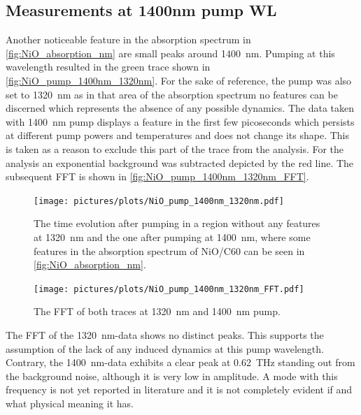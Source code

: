\subsection{Measurements at 1400nm pump WL}
Another noticeable feature in the absorption spectrum in \autoref{fig:NiO_absorption_nm} are small peaks around \qty{1400}{nm}.
Pumping at this wavelength resulted in the green trace shown in \autoref{fig:NiO_pump_1400nm_1320nm}.
For the sake of reference, the pump was also set to \qty{1320}{nm} as in that area of the absorption spectrum no features can be discerned which represents the absence of any possible dynamics.
The data taken with \qty{1400}{nm} pump displays a feature in the first few picoseconds which persists at different pump powers and temperatures and does not change its shape.
This is taken as a reason to exclude this part of the trace from the analysis.
For the analysis an exponential background was subtracted depicted by the red line.
The subsequent FFT is shown in \autoref{fig:NiO_pump_1400nm_1320nm_FFT}.
\vspace*{-0.5cm}
\begin{figure}[ht]
    \centering
    \texttt{[image: pictures/plots/NiO\_pump\_1400nm\_1320nm.pdf]} \vspace{-0.5cm}
    \caption{The time evolution after pumping in a region without any features at \qty{1320}{nm} and the one after pumping at \qty{1400}{nm}, where some features in the absorption spectrum of NiO/C60 can be seen in \autoref{fig:NiO_absorption_nm}.}
    \label{fig:NiO_pump_1400nm_1320nm}
\end{figure}
\FloatBarrier
\begin{figure}[ht]
    \centering
    \texttt{[image: pictures/plots/NiO\_pump\_1400nm\_1320nm\_FFT.pdf]} \vspace{-0.5cm}
    \caption{The FFT of both traces at \qty{1320}{nm} and \qty{1400}{nm} pump.}
    \label{fig:NiO_pump_1400nm_1320nm_FFT}
\end{figure}
\FloatBarrier
The FFT of the \qty{1320}{nm}-data shows no distinct peaks.
This supports the assumption of the lack of any induced dynamics at this pump wavelength.
Contrary, the \qty{1400}{nm}-data exhibits a clear peak at \qty{0.62}{THz} standing out from the background noise, although it is very low in amplitude.
A mode with this frequency is not yet reported in literature and it is not completely evident if and what physical meaning it has.

\newpage
